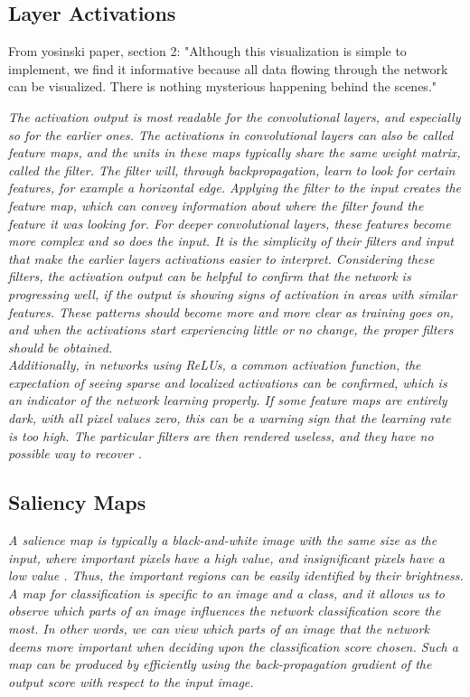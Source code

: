 \subsection{Layer Activations}

From yosinski paper, section 2: "Although this visualization is simple to implement, we find
it informative because all data flowing through the network can be visualized. There is nothing mysterious happening behind the scenes."

\textit{The activation output is most readable for the convolutional layers, and especially so for the earlier ones. The activations in convolutional layers can also be called feature maps, and the units in these maps typically share the same weight matrix, called the filter. The filter will, through backpropagation, learn to look for certain features, for example a horizontal edge. Applying the filter to the input creates the feature map, which can convey information about where the filter found the feature it was looking for. For deeper convolutional layers, these features become more complex and so does the input. It is the simplicity of their filters and input that make the earlier layers activations easier to interpret. Considering these filters, the activation output can be helpful to confirm that the network is progressing well, if the output is showing signs of activation in areas with similar features. These patterns should become more and more clear as training goes on, and when the activations start experiencing little or no change, the proper filters should be obtained.} \\

\noindent \textit{Additionally, in networks using ReLUs, a common activation function, the expectation of seeing sparse and localized activations can be confirmed, which is an indicator of the network learning properly. If some feature maps are entirely dark, with all pixel values zero, this can be a warning sign that the learning rate is too high. The particular filters are then rendered useless, and they have no possible way to recover \cite{cs231n_act}. }

\subsection{Saliency Maps}

\textit{A salience map is typically a black-and-white image with the same size as the input, where important pixels have a high value, and insignificant pixels have a low value \cite{salience}. Thus, the important regions can be easily identified by their brightness. A map for classification is specific to an image and a class, and it allows us to observe which parts of an image influences the network classification score the most. In other words, we can view which parts of an image that the network deems more important when deciding upon the classification score chosen. Such a map can be produced by efficiently using the back-propagation gradient of the output score with respect to the input image.} \\

